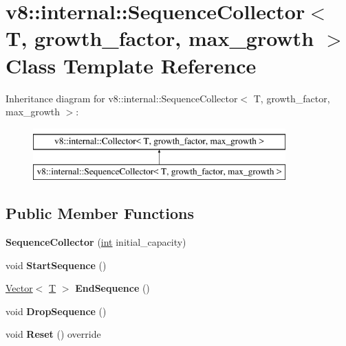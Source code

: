 \hypertarget{classv8_1_1internal_1_1SequenceCollector}{}\section{v8\+:\+:internal\+:\+:Sequence\+Collector$<$ T, growth\+\_\+factor, max\+\_\+growth $>$ Class Template Reference}
\label{classv8_1_1internal_1_1SequenceCollector}
Inheritance diagram for v8\+:\+:internal\+:\+:Sequence\+Collector$<$ T, growth\+\_\+factor, max\+\_\+growth $>$\+:\begin{figure}[H]
\begin{center}
\leavevmode
\includegraphics[height=2.000000cm]{classv8_1_1internal_1_1SequenceCollector}
\end{center}
\end{figure}
\subsection*{Public Member Functions}
\begin{DoxyCompactItemize}
\item 
\mbox{\label{classv8_1_1internal_1_1SequenceCollector_aacd053b98186d77b14e4dfc40579d43c}} 
{\bfseries Sequence\+Collector} (\mbox{\hyperlink{classint}{int}} initial\+\_\+capacity)
\item 
\mbox{\label{classv8_1_1internal_1_1SequenceCollector_a880a4b89cafb1ebb207002eed168fd03}} 
void {\bfseries Start\+Sequence} ()
\item 
\mbox{\label{classv8_1_1internal_1_1SequenceCollector_a9f9ca468a39096e8d4db2ea4f8c9752b}} 
\mbox{\hyperlink{classv8_1_1internal_1_1Vector}{Vector}}$<$ \mbox{\hyperlink{classv8_1_1internal_1_1torque_1_1T}{T}} $>$ {\bfseries End\+Sequence} ()
\item 
\mbox{\label{classv8_1_1internal_1_1SequenceCollector_a1463c63b307d6d9a5633425b72a7a058}} 
void {\bfseries Drop\+Sequence} ()
\item 
\mbox{\label{classv8_1_1internal_1_1SequenceCollector_afbf153010c8e0b18bd0116b8d350a53e}} 
void {\bfseries Reset} () override
\end{DoxyCompactItemize}
